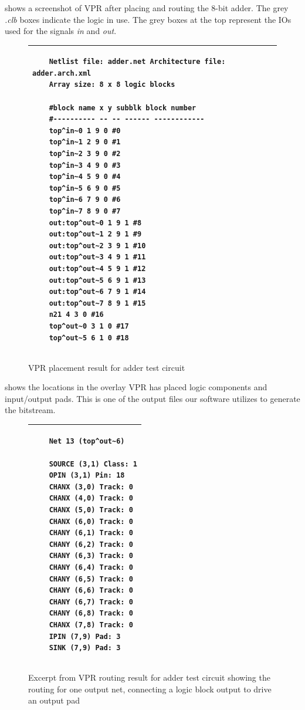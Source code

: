  shows a screenshot of VPR after placing and routing the 8-bit adder.
The grey \emph{.clb} boxes indicate the logic in use.
The grey boxes at the top represent the IOs used for the signals \emph{in} and \emph{out}.

\begin{figure}[!h]
	\centering
	\begin{tabular}{|p{13cm}|}
	\hline
	\begin{verbatim}
	Netlist file: adder.net Architecture file: adder.arch.xml
	Array size: 8 x 8 logic blocks

	#block name x y subblk block number
	#---------- -- -- ------ ------------
	top^in~0 1 9 0 #0
	top^in~1 2 9 0 #1
	top^in~2 3 9 0 #2
	top^in~3 4 9 0 #3
	top^in~4 5 9 0 #4
	top^in~5 6 9 0 #5
	top^in~6 7 9 0 #6
	top^in~7 8 9 0 #7
	out:top^out~0 1 9 1 #8
	out:top^out~1 2 9 1 #9
	out:top^out~2 3 9 1 #10
	out:top^out~3 4 9 1 #11
	out:top^out~4 5 9 1 #12
	out:top^out~5 6 9 1 #13
	out:top^out~6 7 9 1 #14
	out:top^out~7 8 9 1 #15
	n21 4 3 0 #16
	top^out~0 3 1 0 #17
	top^out~5 6 1 0 #18
	\end{verbatim}
	\\ \hline
	\end{tabular}
	\caption{VPR placement result for adder test circuit}
	\label{adder-place}
\end{figure}

 shows the locations in the overlay VPR has placed logic components and input/output pads.
This is one of the output files our software utilizes to generate the bitstream.

\pagebreak

\begin{figure}[!h]
	\centering
	\begin{tabular}{|p{13cm}|}
	\hline
	\begin{verbatim}
	Net 13 (top^out~6)

	SOURCE (3,1) Class: 1
	OPIN (3,1) Pin: 18
	CHANX (3,0) Track: 0
	CHANX (4,0) Track: 0
	CHANX (5,0) Track: 0
	CHANX (6,0) Track: 0
	CHANY (6,1) Track: 0
	CHANY (6,2) Track: 0
	CHANY (6,3) Track: 0
	CHANY (6,4) Track: 0
	CHANY (6,5) Track: 0
	CHANY (6,6) Track: 0
	CHANY (6,7) Track: 0
	CHANY (6,8) Track: 0
	CHANX (7,8) Track: 0
	IPIN (7,9) Pad: 3
	SINK (7,9) Pad: 3
	\end{verbatim}
	\\ \hline
	\end{tabular}
	\caption{Excerpt from VPR routing result for adder test circuit showing the routing for one output net, connecting a logic block output to drive an output pad}
	\label{adder-route}
\end{figure}

